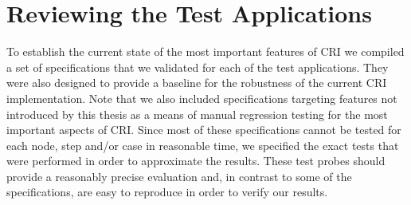 \section{Reviewing the Test Applications}
\label{sec:EvalTests}
To establish the current state of the most important features of CRI we compiled a set of specifications that we validated for each of the test applications. They were also designed to provide a baseline for the robustness of the current CRI implementation. Note that we also included specifications targeting features not introduced by this thesis as a means of manual regression testing for the most important aspects of CRI. Since most of these specifications cannot be tested for each node, step and/or case in reasonable time, we specified the exact tests that were performed in order to approximate the results. These test probes should provide a reasonably precise evaluation and, in contrast to some of the specifications, are easy to reproduce in order to verify our results.

